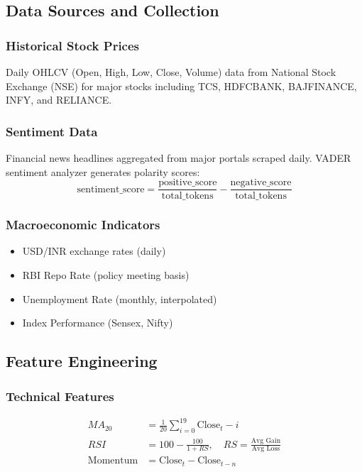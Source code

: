 \documentclass[conference]{IEEEtran}
\begin{document}
\subsection{Data Sources and Collection}

\subsubsection{Historical Stock Prices}

Daily OHLCV (Open, High, Low, Close, Volume) data from National Stock Exchange (NSE) for major stocks including TCS, HDFCBANK, BAJFINANCE, INFY, and RELIANCE.

\subsubsection{Sentiment Data}

Financial news headlines aggregated from major portals scraped daily. VADER sentiment analyzer generates polarity scores:
\begin{equation}
\text{sentiment\_score} = \frac{\text{positive\_score}}{\text{total\_tokens}} - \frac{\text{negative\_score}}{\text{total\_tokens}}
\end{equation}

\subsubsection{Macroeconomic Indicators}

\begin{itemize}
\item USD/INR exchange rates (daily)
\item RBI Repo Rate (policy meeting basis)
\item Unemployment Rate (monthly, interpolated)
\item Index Performance (Sensex, Nifty)
\end{itemize}

\subsection{Feature Engineering}

\subsubsection{Technical Features}

\begin{equation}
\begin{aligned}
MA_{20} &= \frac{1}{20}\sum_{i=0}^{19} \text{Close}_t-i \\
RSI &= 100 - \frac{100}{1 + RS}, \quad RS = \frac{\text{Avg Gain}}{\text{Avg Loss}} \\
\text{Momentum} &= \text{Close}_t - \text{Close}_{t-n}
\end{aligned}
\end{equation}
\end{document}
